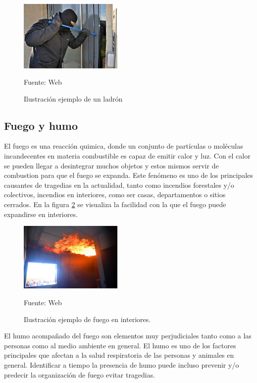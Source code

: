 \begin{figure}[H]
    \begin{center}
        \includegraphics[width=5cm]{img/capitulo_3/burglar.jpg}
    \end{center}
    \begin{center}
        \caption{Ilustración ejemplo de un ladrón} 
        Fuente: Web
        \label{fig:ladron}
    \end{center}
\end{figure}

\subsection{Fuego y humo}
El fuego es una reacción quimica, donde un conjunto de partículas o moléculas incandecentes en materia combustible es capaz de emitir calor y luz. Con el calor se pueden llegar a desintegrar muchos objetos y estos mismos servir de combustion para que el fuego se expanda.
Este fenómeno es uno de los principales causantes de tragedias en la actualidad, tanto como incendios forestales y/o colectivos, incendios en interiores, como ser casas, departamentos o sitios cerrados. En la figura \ref{fig:fuego} se visualiza la facilidad con la que el fuego puede expandirse en interiores.

\begin{figure}[H]
    \begin{center}
        \includegraphics[width=5cm]{img/capitulo_3/fuego_en_interiores.jpg}
        \caption{Ilustración ejemplo de fuego en interiores.} 
        Fuente: Web
        \label{fig:fuego}
    \end{center}
\end{figure}

El humo acompañado del fuego son elementos muy perjudiciales tanto como a las personas como al medio ambiente en general. El humo es uno de los factores principales que afectan a la salud respiratoria de las personas y animales en general. Identificar a tiempo la presencia de humo puede incluso prevenir y/o predecir la organización de fuego  evitar tragedias.

